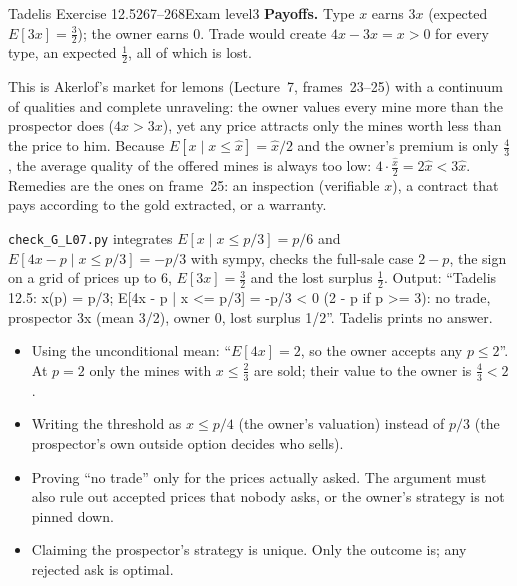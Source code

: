 \begin{exsol}{Tadelis Exercise 12.5}{267--268}{Exam level}{3}
\textbf{Payoffs.} Type $x$ earns $3x$ (expected $E[3x] = \frac32$); the owner earns $0$. Trade would create
$4x - 3x = x > 0$ for every type, an expected $\frac12$, all of which is lost.

\interp This is Akerlof's market for lemons (Lecture~7, frames~23--25) with a continuum of qualities and
complete unraveling: the owner values every mine more than the prospector does ($4x > 3x$), yet any price
attracts only the mines worth less than the price to him. Because $E[x \mid x \le \hat x] = \hat x/2$ and the
owner's premium is only $\frac43$, the average quality of the offered mines is always too low:
$4 \cdot \frac{\hat x}{2} = 2\hat x < 3\hat x$. Remedies are the ones on frame~25: an inspection
(verifiable $x$), a contract that pays according to the gold extracted, or a warranty.

\verify \texttt{check\_G\_L07.py} integrates $E[x \mid x \le p/3] = p/6$ and $E[4x - p \mid x \le p/3] = -p/3$ with
sympy, checks the full-sale case $2 - p$, the sign on a grid of prices up to $6$, $E[3x] = \frac32$ and the
lost surplus $\frac12$. Output: ``Tadelis 12.5: x(p) = p/3; E[4x - p | x <= p/3] = -p/3 < 0 (2 - p if p >= 3):
no trade, prospector 3x (mean 3/2), owner 0, lost surplus 1/2''. Tadelis prints no answer.

\mistakes
\begin{itemize}
  \item Using the unconditional mean: ``$E[4x] = 2$, so the owner accepts any $p \le 2$''. At $p = 2$ only
  the mines with $x \le \frac23$ are sold; their value to the owner is $\frac43 < 2$.
  \item Writing the threshold as $x \le p/4$ (the owner's valuation) instead of $p/3$ (the prospector's
  own outside option decides who sells).
  \item Proving ``no trade'' only for the prices actually asked. The argument must also rule out accepted
  prices that nobody asks, or the owner's strategy is not pinned down.
  \item Claiming the prospector's strategy is unique. Only the outcome is; any rejected ask is optimal.
\end{itemize}

\end{exsol}
